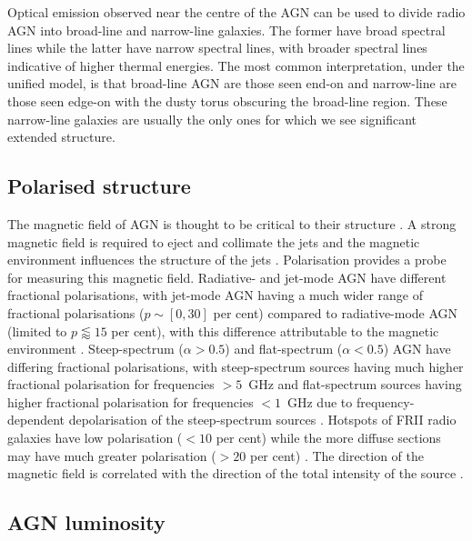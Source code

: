         Optical emission observed near the centre of the AGN can be used to divide radio AGN into broad-line and narrow-line galaxies. The former have broad spectral lines while the latter have narrow spectral lines, with broader spectral lines indicative of higher thermal energies. The most common interpretation, under the unified model, is that broad-line AGN are those seen end-on and narrow-line are those seen edge-on with the dusty torus obscuring the broad-line region. These narrow-line galaxies are usually the only ones for which we see significant extended structure.

    \subsection{Polarised structure}
    \label{sec:polarised-structure-of-agn}

        The magnetic field of AGN is thought to be critical to their structure \citep{sikora_magnetic_2013}. A strong magnetic field is required to eject and collimate the jets \citep{lovelace_dynamo_1976} and the magnetic environment influences the structure of the jets \citep{osullivan_magnetic_2015}. Polarisation provides a probe for measuring this magnetic field. Radiative- and jet-mode AGN have different fractional polarisations, with jet-mode AGN having a much wider range of fractional polarisations ($p \sim [0, 30]$ per cent) compared to radiative-mode AGN (limited to $p \lessapprox 15$ per cent), with this difference attributable to the magnetic environment \citep{osullivan_magnetic_2015}. Steep-spectrum ($\alpha > 0.5$) and flat-spectrum ($\alpha < 0.5$) AGN have differing fractional polarisations, with steep-spectrum sources having much higher fractional polarisation for frequencies $> 5$~GHz and flat-spectrum sources having higher fractional polarisation for frequencies $< 1$~GHz due to frequency-dependent depolarisation of the steep-spectrum sources \citep{saikia_polarization_1988}. Hotspots of FRII radio galaxies have low polarisation ($<10$ per cent) while the more diffuse sections may have much greater polarisation ($>20$ per cent) \citep{saikia_polarization_1988}. The direction of the magnetic field is correlated with the direction of the total intensity of the source \citep{saikia_polarization_1988}.

    \subsection{AGN luminosity}
    \label{sec:agn-throughout}

